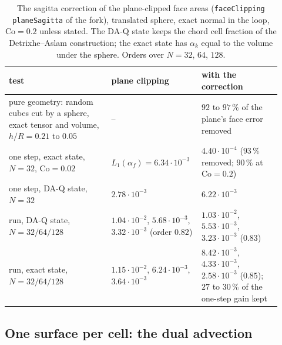 \documentclass[preprint,12pt]{elsarticle}
\begin{document}
\begin{table}[htbp]
\centering
\caption{The sagitta correction of the plane-clipped face areas (\texttt{faceClipping planeSagitta} of the fork), translated sphere, exact normal in the loop, $\mathrm{Co} = 0.2$ unless stated. The DA-Q state keeps the chord cell fraction of the Detrixhe--Aslam construction; the exact state has $\alpha_k$ equal to the volume under the sphere. Orders over $N = 32$, $64$, $128$.}
\label{tab:tpf-sagitta}
\footnotesize
\begin{tabular}{p{0.36\linewidth}p{0.28\linewidth}p{0.28\linewidth}}
\toprule
test & plane clipping & with the correction \\
\midrule
pure geometry: random cubes cut by a sphere, exact tensor and volume, $h/R = 0.21$ to $0.05$ & -- & $92$ to $97\,\%$ of the plane's face error removed \\
one step, exact state, $N = 32$, $\mathrm{Co} = 0.02$ & $L_1(\alpha_f) = 6.34\cdot10^{-3}$ & $4.40\cdot10^{-4}$ ($93\,\%$ removed; $90\,\%$ at $\mathrm{Co} = 0.2$) \\
one step, DA-Q state, $N = 32$ & $2.78\cdot10^{-3}$ & $6.22\cdot10^{-3}$ \\
run, DA-Q state, $N = 32/64/128$ & $1.04\cdot10^{-2}$, $5.68\cdot10^{-3}$, $3.32\cdot10^{-3}$ (order $0.82$) & $1.03\cdot10^{-2}$, $5.53\cdot10^{-3}$, $3.23\cdot10^{-3}$ ($0.83$) \\
run, exact state, $N = 32/64/128$ & $1.15\cdot10^{-2}$, $6.24\cdot10^{-3}$, $3.64\cdot10^{-3}$ & $8.42\cdot10^{-3}$, $4.33\cdot10^{-3}$, $2.58\cdot10^{-3}$ ($0.85$); $27$ to $30\,\%$ of the one-step gain kept \\
\bottomrule
\end{tabular}
\end{table}

\subsection{One surface per cell: the dual advection}
\label{sec:tpf-dual}
\end{document}
